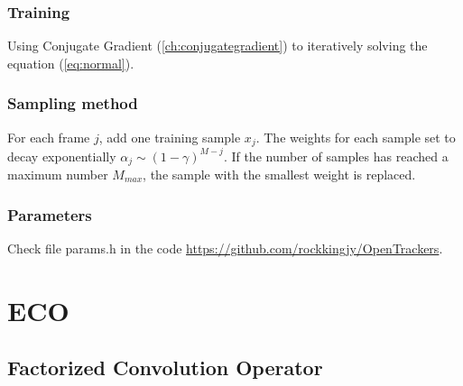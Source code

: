 \documentclass[12pt]{article}
\numberwithin{equation}{section}
\begin{document}
\subsubsection{Training}
Using Conjugate Gradient (\ref{ch:conjugategradient}) to iteratively solving the equation (\ref{eq:normal}).
\subsubsection{Sampling method} \label{ch:samplingccot}
For each frame $j$, add one training sample $x_j$. The weights for each sample set to decay exponentially $\alpha_j \sim (1-\gamma)^{M-j}$. If the number of samples has reached a maximum number $M_{max}$, the sample with the smallest weight is replaced.
\subsubsection{Parameters}
Check file params.h in the code \url{https://github.com/rockkingjy/OpenTrackers}. 
\section{ECO \cite{DanelljanCVPR2017}} \label{ch:eco}
\subsection{Factorized Convolution Operator}
\end{document}
